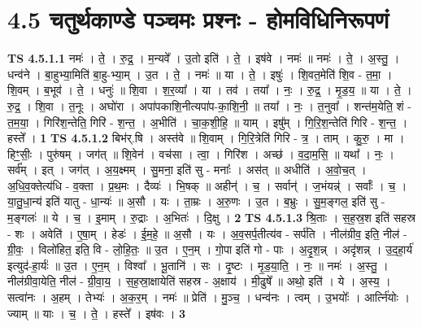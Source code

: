 \documentclass[17pt]{extarticle}
\begin{document}
\section*{ 4.5      चतुर्थकाण्डे पञ्चमः प्रश्नः - होमविधिनिरूपणं }
                                \textbf{ TS 4.5.1.1} \newline
                  नमः॑ । ते॒ । रु॒द्र॒ । म॒न्यवे᳚ । उ॒तो इति॑ । ते॒ । इष॑वे । नमः॑ ॥ नमः॑ । ते॒ । अ॒स्तु॒ । धन्व॑ने । बा॒हुभ्या॒मिति॑ बा॒हु-भ्या॒म् । उ॒त । ते॒ । नमः॑ ॥ या । ते॒ । इषुः॑ । शि॒वत॒मेति॑ शि॒व - त॒मा॒ । शि॒वम् । ब॒भूव॑ । ते॒ । धनुः॑ ॥ शि॒वा । श॒र॒व्या᳚ । या । तव॑ । तया᳚ । नः॒ । रु॒द्र॒ । मृ॒ड॒य॒ ॥ या । ते॒ । रु॒द्र॒ । शि॒वा । त॒नूः । अघो॑रा । अपा॑पकाशि॒नीत्यपा॑प-का॒शि॒नी॒ ॥ तया᳚ । नः॒ । त॒नुवा᳚ । शन्त॑म॒येति॒ शं - त॒म॒या॒ । गिरि॑श॒न्तेति॒ गिरि॑ - श॒न्त॒ । अ॒भीति॑ । चा॒क॒शी॒हि॒ ॥ याम् । इषु᳚म् । गि॒रि॒श॒न्तेति॑ गिरि - श॒न्त॒ । हस्ते᳚ । \textbf{  1} \newline
                  \newline
                                \textbf{ TS 4.5.1.2} \newline
                  बिभ॑र्.षि । अस्त॑वे ॥ शि॒वाम् । गि॒रि॒त्रेति॑ गिरि - त्र॒ । ताम् । कु॒रु॒ । मा । हिꣳ॒॒सीः॒ । पुरु॑षम् । जग॑त् ॥ शि॒वेन॑ । वच॑सा । त्वा॒ । गिरि॑श । अच्छ॑ । व॒दा॒म॒सि॒ ॥ यथा᳚ । नः॒ । सर्व᳚म् । इत् । जग॑त् । अ॒य॒क्ष्मम् । सु॒मना॒ इति॑ सु - मनाः᳚ । अस॑त् ॥ अधीति॑ । अ॒वो॒च॒त् । अ॒धि॒व॒क्तेत्य॑धि - व॒क्ता । प्र॒थ॒मः । दैव्यः॑ । भि॒षक् ॥ अहीन्॑ । च॒ । सर्वान्॑ । ज॒भंयन्न्॑ । सर्वाः᳚ । च॒ । या॒तु॒धा॒न्य॑ इति॑ यातु - धा॒न्यः॑ ॥ अ॒सौ । यः । ता॒म्रः । अ॒रु॒णः । उ॒त । ब॒भ्रुः । सु॒म॒ङ्गल॒ इति॑ सु - म॒ङ्गलः॑ ॥ ये । च॒ । इ॒माम् । रु॒द्राः । अ॒भितः॑ । दि॒क्षु । \textbf{  2} \newline
                  \newline
                                \textbf{ TS 4.5.1.3} \newline
                  श्रि॒ताः । स॒ह॒स्र॒श इति॑ सहस्र - शः । अवेति॑ । ए॒षा॒म् । हेडः॑ । ई॒म॒हे॒ ॥ अ॒सौ । यः । अ॒व॒सर्प॒तीत्य॑व - सर्प॑ति । नील॑ग्रीव॒ इति॒ नील॑ - ग्री॒वः॒ । विलो॑हित॒ इति॒ वि - लो॒हि॒तः॒ ॥ उ॒त । ए॒न॒म् । गो॒पा इति॑ गो - पाः । अ॒दृ॒श॒न्न् । अदृ॑शन्न् । उ॒द॒हा॒र्य॑ इत्युद॑-हा॒र्यः॑ ॥ उ॒त । ए॒न॒म् । विश्वा᳚ । भू॒तानि॑ । सः । दृ॒ष्टः । मृ॒ड॒या॒ति॒ । नः॒ ॥ नमः॑ । अ॒स्तु॒ । नील॑ग्रीवा॒येति॒ नील॑ - ग्री॒वा॒य॒ । स॒ह॒स्रा॒क्षायेति॑ सहस्र - अ॒क्षाय॑ । मी॒ढुषे᳚ ॥ अथो॒ इति॑ । ये । अ॒स्य॒ । सत्वा॑नः । अ॒हम् । तेभ्यः॑ । अ॒क॒र॒म् । नमः॑ ॥ प्रेति॑ । मु॒ञ्च॒ । धन्व॑नः । त्वम् । उ॒भयोः᳚ । आर्त्नि॑योः । ज्याम् ॥ याः । च॒ । ते॒ । हस्ते᳚ । इष॑वः । \textbf{  3} \newline
\end{document}
